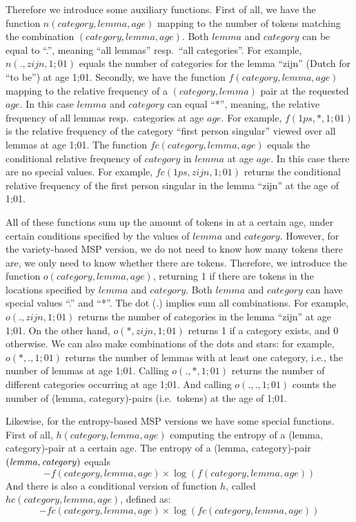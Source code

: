 \documentclass{article}
\newcommand{\age}{\mathit{age}}
\newcommand{\lemma}{\mathit{lemma}}
\newcommand{\category}{\mathit{category}}
\newcommand{\fc}{\mathit{fc}}
\newcommand{\hc}{\mathit{hc}}
\begin{document}
Therefore we introduce some auxiliary functions. First of all, we have the function $n(\category, \lemma, \age)$ mapping to the number of tokens matching the combination $(\category, \lemma, \age)$. Both $\lemma$ and $\category$ can be equal to ``.'', meaning ``all lemmas'' resp.\ ``all categories''. For example, $n(., \mathit{zijn}, 1;01)$ equals the number of categories for the lemma ``zijn'' (Dutch for ``to be'') at age 1;01. Secondly, we have the function $f(\category, \lemma, \age)$ mapping to the relative frequency of a $(\category, \lemma)$ pair at the requested $\age$. In this case $\lemma$ and $\category$ can equal ``*'', meaning, the relative frequency of all lemmas resp.\ categories at age $\age$. For example, $f(\mathit{1ps}, *, 1;01)$ is the relative frequency of the category ``first person singular'' viewed over all lemmas at age 1;01. The function $\fc(\category, \lemma, \age)$ equals the conditional relative frequency of $\category$ in $\lemma$ at age $\age$. In this case there are no special values. For example, $\fc(\mathit{1ps}, \mathit{zijn}, 1;01)$ returns the conditional relative frequency of the first person singular in the lemma ``zijn'' at the age of 1;01.

All of these functions sum up the amount of tokens in at a certain age, under certain conditions specified by the values of $\lemma$ and $\category$. However, for the variety-based MSP version, we do not need to know how many tokens there are, we only need to know whether there are tokens. Therefore, we introduce the function $o(\category, \lemma, \age)$, returning 1 if there are tokens in the locations specified by $\lemma$ and $\category$. Both $\lemma$ and $\category$ can have special values ``.'' and ``*''. The dot (.) implies sum all combinations. For example, $o(., zijn, 1;01)$ returns the number of categories in the lemma ``zijn'' at age 1;01. On the other hand, $o(*, zijn, 1;01)$ returns 1 if a category exists, and 0 otherwise. We can also make combinations of the dots and stars: for example, $o(*, ., 1;01)$ returns the number of lemmas with at least one category, i.e., the number of lemmas at age 1;01. Calling $o(., *, 1;01)$ returns the number of different categories occurring at age 1;01. And calling $o(., ., 1;01)$ counts the number of (lemma, category)-pairs (i.e.\ tokens) at the age of 1;01.

Likewise, for the entropy-based MSP versions we have some special functions. First of all, $h(\category, \lemma, \age)$ computing the entropy of a (lemma, category)-pair at a certain age. The entropy of a (lemma, category)-pair $(\lemma,\break \category)$ equals 
$$- f(\category, \lemma, \age) \times \log( f(\category, \lemma, \age) )$$ 
And there is also a conditional version of function $h$, called $\hc(\category, \lemma, \age)$, defined as:
$$- \fc(\category, \lemma, \age) \times \log( \fc(\category, \lemma, \age) )$$
\end{document}

